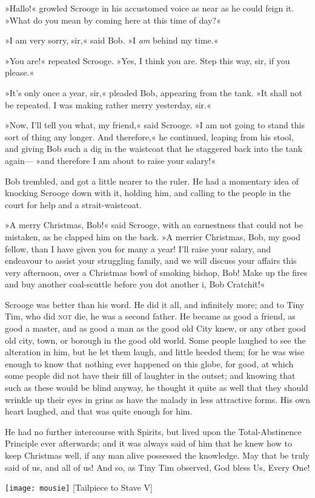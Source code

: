 »Hallo!« growled Scrooge in his accustomed voice as near as he could feign it. »What do you mean by coming here at this time of day?«

»I am very sorry, sir,« said Bob. »I \textit{am} behind my time.«

»You are!« repeated Scrooge. »Yes, I think you are. Step this way, sir, if you please.«

»It's only once a year, sir,« pleaded Bob, appearing from the tank. »It shall not be repeated. I was making rather merry yesterday, sir.«

»Now, I'll tell you what, my friend,« said Scrooge. »I am not going to stand this sort of thing any longer. And therefore,« he continued, leaping from his stool, and giving Bob such a dig in the waistcoat that he staggered back into the tank again--- »and therefore I am about to raise your salary!«

Bob trembled, and got a little nearer to the ruler. He had a momentary idea of knocking Scrooge down with it, holding him, and calling to the people in the court for help and a strait-waistcoat.

»A merry Christmas, Bob!« said Scrooge, with an earnestness that could not be mistaken, as he clapped him on the back. »A merrier Christmas, Bob, my good fellow, than I have given you for many a year! I'll raise your salary, and endeavour to assist your struggling family, and we will discuss your affairs this very afternoon, over a Christmas bowl of smoking bishop, Bob! Make up the fires and buy another coal-scuttle before you dot another i, Bob Cratchit!«

Scrooge was better than his word. He did it all, and infinitely more; and to Tiny Tim, who did \textsc{not} die, he was a second father. He became as good a friend, as good a master, and as good a man as the good old City knew, or any other good old city, town, or borough in the good old world. Some people laughed to see the alteration in him, but he let them laugh, and little heeded them; for he was wise enough to know that nothing ever happened on this globe, for good, at which some people did not have their fill of laughter in the outset; and knowing that such as these would be blind anyway, he thought it quite as well that they should wrinkle up their eyes in grins as have the malady in less attractive forms. His own heart laughed, and that was quite enough for him.

He had no further intercourse with Spirits, but lived upon the Total-Abstinence Principle ever afterwards; and it was always said of him that he knew how to keep Christmas well, if any man alive possessed the knowledge. May that be truly said of us, and all of us! And so, as Tiny Tim observed, God bless Us, Every One!




\begin{center}
	\texttt{[image: mousie]}
	[Tailpiece to Stave V]{}
\end{center}
\enlargethispage {\baselineskip} 


